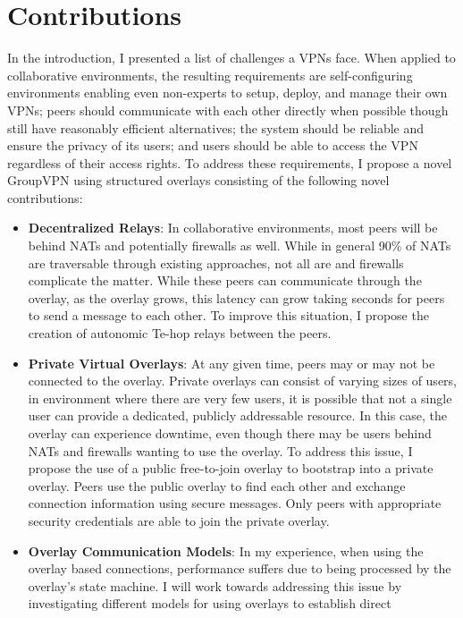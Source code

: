 \section{Contributions}
In the introduction, I presented a list of challenges a VPNs face.  When
applied to collaborative environments, the resulting requirements are 
self-configuring environments enabling even non-experts to setup, deploy,
and manage their own VPNs; peers should communicate with each other
directly when possible though still have reasonably efficient alternatives;
the system should be reliable and ensure the privacy of its users; and
users should be able to access the VPN regardless of their access rights.
To address these requirements, I propose a novel GroupVPN using structured
overlays consisting of the following novel contributions:

\begin{itemize}
\item \textbf{Decentralized Relays}:  In collaborative environments, most peers
will be behind NATs and potentially firewalls as well.  While in general 90\% of
NATs are traversable through existing approaches, not all are and firewalls
complicate the matter.  While these peers can communicate through the overlay,
as the overlay grows, this latency can grow taking seconds for peers to send
a message to each other.  To improve this situation, I propose the creation of
autonomic Te-hop relays between the peers.
\item \textbf{Private Virtual Overlays}:  At any given time, peers may or may
not be connected to the overlay.  Private overlays can consist of varying sizes
of users, in environment where there are very few users, it is possible that
not a single user can provide a dedicated, publicly addressable  resource.  In
this case, the overlay can experience downtime, even though there may be users
behind NATs and firewalls wanting to use the overlay.  To address this issue,
I propose the use of a public free-to-join overlay to bootstrap into a private
overlay.  Peers use the public overlay to find each other and exchange connection
information using secure messages.  Only peers with appropriate security
credentials are able to join the private overlay.
\item \textbf{Overlay Communication Models}: In my experience, when using the
overlay based connections, performance suffers due to being processed by the
overlay's state machine.  I will work towards addressing this issue by
investigating different models for using overlays to establish direct

\end{itemize}
